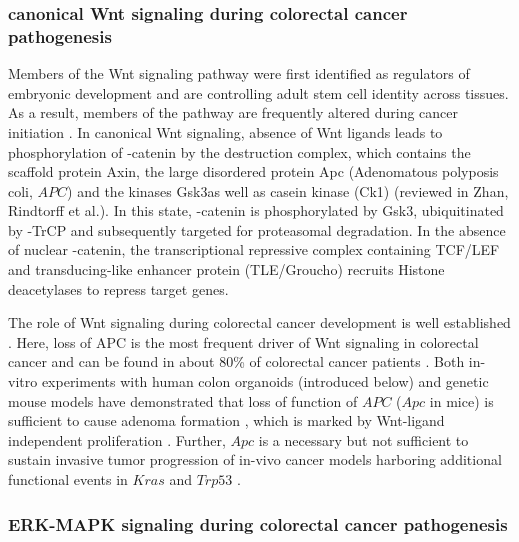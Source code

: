 \begin{flushleft}
\subsubsection{canonical Wnt signaling during colorectal cancer pathogenesis}

Members of the Wnt signaling pathway were first identified as regulators of embryonic development \citep{sharmaEffectWinglessWg11976, nusslein-volhardMutationsAffectingSegment1980} and are controlling adult stem cell identity across tissues. As a result, members of the pathway are frequently altered during cancer initiation \citep{zhanWntSignalingCancer2017}. In canonical Wnt signaling, absence of Wnt ligands leads to phosphorylation of \textbeta-catenin by the destruction complex, which contains the scaffold protein Axin, the large disordered protein Apc (Adenomatous polyposis coli, $APC$) and the kinases Gsk3\textbeta as well as casein kinase (Ck1\textalpha) (reviewed in Zhan, Rindtorff et al.\citep{zhanWntSignalingCancer2017}). 
In this state, \textbeta-catenin is phosphorylated by Gsk3\textbeta, ubiquitinated by \textbeta-TrCP and subsequently targeted for proteasomal degradation. In the absence of nuclear \textbeta-catenin, the transcriptional repressive complex containing TCF/LEF and transducing-like enhancer protein (TLE/Groucho) recruits Histone deacetylases to repress target genes. \par 

The role of Wnt signaling during colorectal cancer development is well established \citep{polakisManyWaysWnt2007}. Here, loss of APC is the most frequent driver of Wnt signaling in colorectal cancer and can be found in about 80\% of colorectal cancer patients \citep{fearonMolecularGeneticsColorectal2011, zhanWntSignalingCancer2017}. Both in-vitro experiments with human colon organoids (introduced below) and genetic mouse models have demonstrated that loss of function of $APC$ ($Apc$ in mice) is sufficient to cause adenoma formation \citep{moserApcMinMouseModel1995}, which is marked by Wnt-ligand independent proliferation \citep{matanoModelingColorectalCancer2015a, Drost2015SequentialCells}. Further, $Apc$ is a necessary but not sufficient to sustain invasive tumor progression of in-vivo cancer models harboring additional functional events in $Kras$ and $Trp53$ \citep{dowApcRestorationPromotes2015a, sakaiCombinedMutationApc2018a}.
\par

\subsubsection{ERK-MAPK signaling during colorectal cancer pathogenesis}


\end{flushleft}
